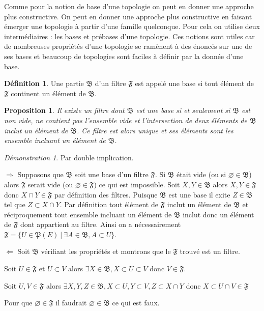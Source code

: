 \documentclass[a4paper, 11pt, french]{book}
\newenvironment{itemise}{\itemize}{\enditemize}
\theoremstyle{plain} %
\newtheorem{proposition}{Proposition}
\theoremstyle{definition} %
\newtheorem{definition}{Définition}
\theoremstyle{remark} %
\newtheorem*{demonstration}{Démonstration}
\newcommand{\1}{\mathds{1}}
\newcommand\vide{\varnothing}
\renewcommand{\frak}[1]{\mathfrak{#1}}
\newcommand\ens[2]{\{#1 \ |\ #2\}}
\newcommand\equivalence[3]{
	\begin{demonstration}
		#1
		\begin{itemise}
			\item[$\Longrightarrow$] #2
			\item[$\Longleftarrow$] #3
		\end{itemise}
	\end{demonstration}
}
\begin{document}
Comme pour la notion de base d'une topologie on peut en donner une approche plus constructive.
On peut en donner une approche plus constructive en faisant émerger une topologie à partir d'une famille quelconque.
Pour cela on utilise deux intermédiaires : les bases et prébases d'une topologie.
Ces notions sont utiles car de nombreuses propriétés d'une topologie se ramènent à des énoncés sur une de ses bases et beaucoup de topologies sont faciles à définir par la donnée d'une base. 

\begin{definition}
 Une partie $\frak{B}$ d'un filtre $\frak{F}$ est appelé une base si tout élément de $\frak{F}$ continent un élément de $\frak{B}$.
\end{definition}

\begin{proposition}
	Il existe un filtre dont $\frak{B}$ est une base si et seulement si $\frak{B}$ est non vide, ne contient pas l'ensemble vide et l'intersection de deux éléments de $\frak{B}$ inclut un élément de $\frak{B}$.
	Ce filtre est alors unique et ses éléments sont les ensemble incluant un élément de $\frak{B}$.
\end{proposition}

\equivalence{Par double implication.}{
	Supposons que $\frak{B}$ soit une base d'un filtre $\frak{F}$.
	Si $\frak{B}$ était vide (ou si $\vide\in\frak{B}$) alors $\frak{F}$ serait vide (ou $\vide\in\frak{F}$) ce qui est impossible.
	Soit $X, Y\in\frak{B}$ alors $X, Y\in\frak{F}$ donc $X\cap Y\in\frak{F}$ par définition des filtres.
	Puisque $\frak{B}$ est une base il exite $Z\in\frak{B}$ tel que $Z\subset X\cap Y$.
	Par définition tout élément de $\frak{F}$ inclut un élément de $\frak{B}$ et réciproquement tout ensemble incluant un élément de $\frak{B}$ inclut donc un élément de $\frak{F}$ dont appartient au filtre.
	Ainsi on a nécessairement $\frak{F}=\ens{U\in\frak{P}(E)}{\exists A\in\frak{B}, A\subset U}$.
}{
	Soit $\frak{B}$ vérifiant les propriétés et montrons que le $\frak{F}$ trouvé est un filtre.
	\begin{itemise}
		\item Soit $U\in\frak{F}$ et $U\subset V$ alors $\exists X\in\frak{B}, X\subset U\subset V$ donc $V\in\frak{F}$.
		\item Soit $U, V\in\frak{F}$ alors $\exists X, Y, Z\in\frak{B}, X\subset U, Y\subset V, Z\subset X\cap Y$ donc $X\subset U\cap V\in\frak{F}$
		\item Pour que $\vide\in\frak{F}$ il faudrait $\vide\in\frak{B}$ ce qui est faux.
	\end{itemise}
}
\end{document}
